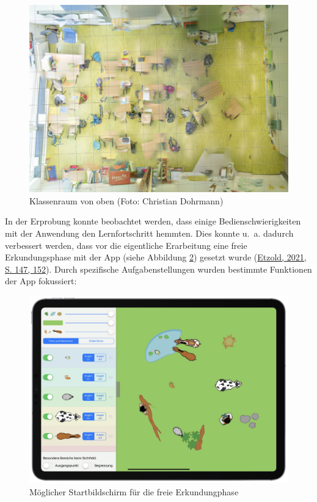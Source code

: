 \documentclass[
]{scrbook}
\theoremstyle{definition}
\theoremstyle{definition}
\theoremstyle{definition}
\theoremstyle{definition}
\theoremstyle{remark}
\begin{document}
\begin{figure}

{\centering \includegraphics[width=0.75\linewidth]{pictures/1-Klassenraum} 

}

\caption{Klassenraum von oben (Foto: Christian Dohrmann)}\label{fig:Klassenraum}
\end{figure}

In der Erprobung konnte beobachtet werden, dass einige Bedienschwierigkeiten mit der Anwendung den Lernfortschritt hemmten. Dies konnte u.~a. dadurch verbessert werden, dass vor die eigentliche Erarbeitung eine freie Erkundungsphase mit der App (siehe Abbildung \ref{fig:WinkelfarmStart}) gesetzt wurde (\protect\hyperlink{ref-Etzold2021}{Etzold, 2021, S. 147, 152}). Durch spezifische Aufgabenstellungen wurden bestimmte Funktionen der App fokussiert:

\begin{figure}

{\centering \includegraphics[width=0.75\linewidth]{pictures/1-WinkelfarmStart} 

}

\caption{Möglicher Startbildschirm für die freie Erkundungphase}\label{fig:WinkelfarmStart}
\end{figure}
\end{document}
